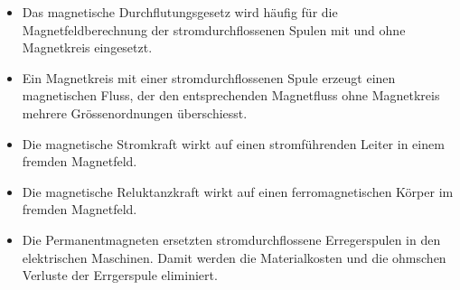 \begin{itemize}
\item Das magnetische Durchflutungsgesetz wird häufig für die Magnetfeldberechnung der stromdurchflossenen Spulen mit und ohne Magnetkreis eingesetzt. 
\item Ein Magnetkreis mit einer stromdurchflossenen Spule erzeugt einen magnetischen Fluss, der den entsprechenden Magnetfluss ohne Magnetkreis mehrere Grössenordnungen überschiesst.
\item Die magnetische Stromkraft wirkt auf einen stromführenden Leiter in einem fremden Magnetfeld.
\item Die magnetische Reluktanzkraft wirkt auf einen ferromagnetischen Körper im fremden Magnetfeld.
\item Die Permanentmagneten ersetzten stromdurchflossene Erregerspulen in den elektrischen Maschinen. Damit werden die Materialkosten und die ohmschen Verluste der Errgerspule eliminiert.
\end{itemize}